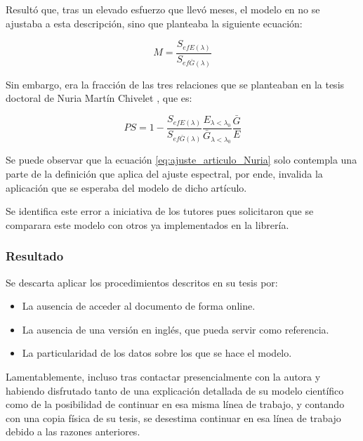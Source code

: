 Resultó que, tras un elevado esfuerzo que llevó meses, el modelo en \cite{Martín_Ruiz_1999} no se ajustaba a esta descripción, sino que planteaba la siguiente ecuación:

\begin{equation} \label{eq:ajuste_articulo_Nuria}
    M = \frac{S_{efE(\lambda)}}{S_{ef\bar{G}(\lambda)}}
\end{equation}

Sin embargo, era la fracción de las tres relaciones que se planteaban en la tesis doctoral de Nuria Martín Chivelet \cite{Martín_Chivelet_1999}, que es:

\begin{equation}
    PS = 1 - \frac{S_{efE(\lambda)}}{S_{ef\bar{G}(\lambda)}}\frac{E_{\lambda<\lambda_0}}{\bar{G}_{\lambda<\lambda_0}}\frac{\bar{G}}{E}
\end{equation}

Se puede observar que la ecuación \ref{eq:ajuste_articulo_Nuria} solo contempla una parte de la definición que aplica del ajuste espectral, por ende, invalida la aplicación que se esperaba del modelo de dicho artículo.

Se identifica este error a iniciativa de los tutores pues solicitaron que se comparara este modelo con otros ya implementados en la librería.

\subsubsection{Resultado}

Se descarta aplicar los procedimientos descritos en su tesis \cite{Martín_Chivelet_1999} por:

\begin{itemize}
    \item La ausencia de acceder al documento de forma online.
    \item La ausencia de una versión en inglés, que pueda servir como referencia.
    \item La particularidad de los datos sobre los que se hace el modelo.
\end{itemize}

Lamentablemente, incluso tras contactar presencialmente con la autora y habiendo disfrutado tanto de una explicación detallada de su modelo científico como de la posibilidad de continuar en esa misma línea de trabajo, y contando con una copia física de su tesis, se desestima continuar en esa línea de trabajo debido a las razones anteriores.

